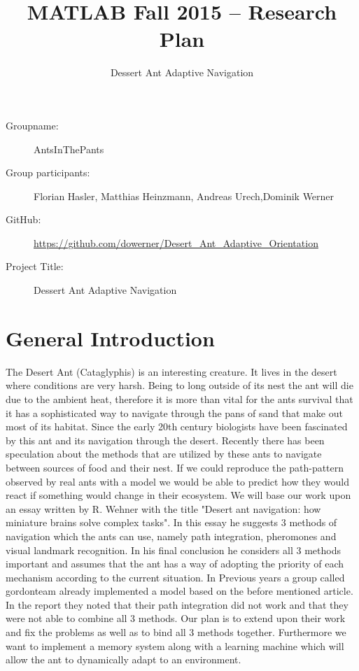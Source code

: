 \documentclass[11pt,a4paper]{scrartcl}
\title{MATLAB Fall 2015 – Research Plan}
\date{}
\author{Dessert Ant Adaptive Navigation}
\begin{document}
\maketitle
\begin{description}
\item[Groupname:] AntsInThePants
\item [Group participants:] Florian Hasler, Matthias Heinzmann, Andreas Urech,Dominik Werner
\item [GitHub: ] \url{ https://github.com/dowerner/Desert_Ant_Adaptive_Orientation}
\item[Project Title:] Dessert Ant Adaptive Navigation
\end{description}
\section*{General Introduction}
The Desert Ant (Cataglyphis) is an interesting creature. It lives in the desert where conditions are very harsh. Being to long outside of its nest the ant will die due to the ambient heat, therefore it is more than vital for the ants survival that it has a sophisticated way to navigate through the pans of sand that make out most of its habitat. Since the early 20th century biologists have been fascinated by this ant and its navigation through the desert. Recently there has been speculation about the methods that are utilized by these ants to navigate between sources of food and their nest. If we could reproduce the path-pattern observed by real ants with a model we would be able to predict how they would react if something would change in their ecosystem.
We will base our work upon an essay written by R. Wehner with the title "Desert ant navigation: how miniature brains solve complex tasks". In this essay he suggests 3 methods of navigation which the ants can use, namely path integration, pheromones and visual landmark recognition. In his final conclusion he considers all 3 methods important and assumes that the ant has a way of adopting the priority of each mechanism according to the current situation.
In Previous years a group called gordonteam already implemented a model based on the before mentioned article. In the report they noted that their path integration did not work and that they were not able to combine all 3 methods. Our plan is to extend upon their work and fix the problems as well as to bind all 3 methods together. Furthermore we want to implement a memory system along with a learning machine which will allow the ant to dynamically adapt to an environment.
\end{document}
